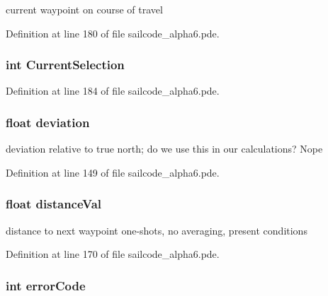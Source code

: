 current waypoint on course of travel 



\-Definition at line 180 of file sailcode\-\_\-alpha6.\-pde.

\hypertarget{group__group1_ga79863a7d6b31d0c89c5050c2cd931cfe}{
\subsubsection[{\-Current\-Selection}]{\setlength{\rightskip}{0pt plus 5cm}int {\bf \-Current\-Selection}}}
\label{group__group1_ga79863a7d6b31d0c89c5050c2cd931cfe}


\-Definition at line 184 of file sailcode\-\_\-alpha6.\-pde.

\hypertarget{group__group1_gad20d9e23979c81b96a060830d0d460a6}{
\subsubsection[{deviation}]{\setlength{\rightskip}{0pt plus 5cm}float {\bf deviation}}}
\label{group__group1_gad20d9e23979c81b96a060830d0d460a6}


deviation relative to true north; do we use this in our calculations? \-Nope 



\-Definition at line 149 of file sailcode\-\_\-alpha6.\-pde.

\hypertarget{group__group1_ga90176c4024ce3ce161b5feda285f97c5}{
\subsubsection[{distance\-Val}]{\setlength{\rightskip}{0pt plus 5cm}float {\bf distance\-Val}}}
\label{group__group1_ga90176c4024ce3ce161b5feda285f97c5}


distance to next waypoint one-\/shots, no averaging, present conditions 



\-Definition at line 170 of file sailcode\-\_\-alpha6.\-pde.

\hypertarget{group__group1_gab675a39a0c7f0587be9ae6734db7ac80}{
\subsubsection[{error\-Code}]{\setlength{\rightskip}{0pt plus 5cm}int {\bf error\-Code}}}
\label{group__group1_gab675a39a0c7f0587be9ae6734db7ac80}


